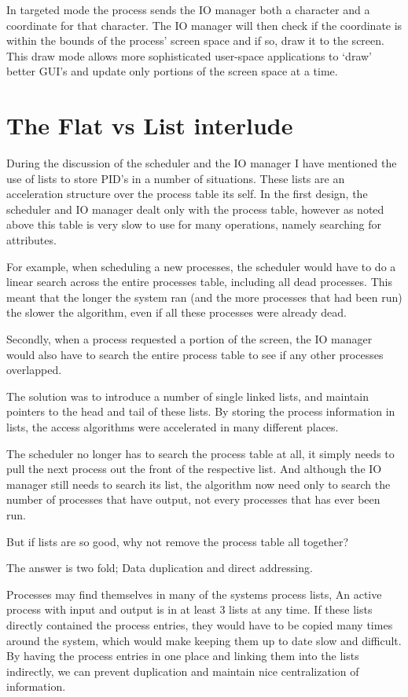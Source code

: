\documentclass[a4paper]{report}
\begin{document}
In targeted mode the process sends the IO manager both a character and a coordinate for that character. The IO manager will then check if the coordinate is within the bounds of the process' screen space and if so, draw it to the screen. This draw mode allows more sophisticated user-space applications to `draw' better GUI's and update only portions of the screen space at a time.

\clearpage
\section{The Flat vs List interlude}

During the discussion of the scheduler and the IO manager I have mentioned the use of lists to store PID's in a number of situations. These lists are an acceleration structure over the process table its self. In the first design, the scheduler and IO manager dealt only with the process table, however as noted above this table is very slow to use for many operations, namely searching for attributes.

For example, when scheduling a new processes, the scheduler would have to do a linear search across the entire processes table, including all dead processes. This meant that the longer the system ran (and the more processes that had been run) the slower the algorithm, even if all these processes were already dead.

Secondly, when a process requested a portion of the screen, the IO manager would also have to search the entire process table to see if any other processes overlapped.

The solution was to introduce a number of single linked lists, and maintain pointers to the head and tail of these lists. By storing the process information in lists, the access algorithms were accelerated in many different places.

The scheduler no longer has to search the process table at all, it simply needs to pull the next process out the front of the respective list. And although the IO manager still needs to search its list, the algorithm now need only to search the number of processes that have output, not every processes that has ever been run.

But if lists are so good, why not remove the process table all together?

The answer is two fold; Data duplication and direct addressing.

Processes may find themselves in many of the systems process lists, An active process with input and output is in at least 3 lists at any time. If these lists directly contained the process entries, they would have to be copied many times around the system, which would make keeping them up to date slow and difficult. By having the process entries in one place and linking them into the lists indirectly, we can prevent duplication and maintain nice centralization of information.
\end{document}

